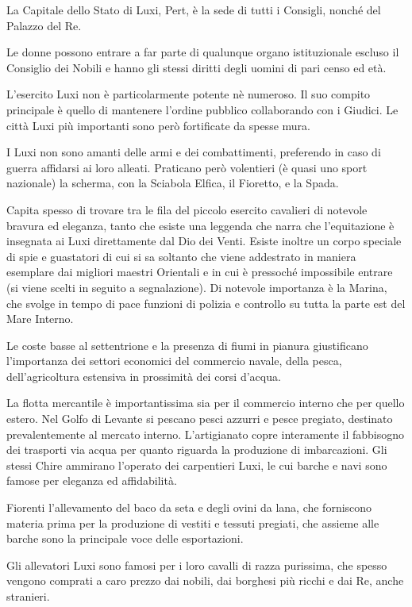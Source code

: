 La Capitale dello Stato di Luxi, Pert, \`e la sede di tutti i
Consigli, nonch\'e del Palazzo del Re.

Le donne possono entrare a far parte di qualunque organo istituzionale
escluso il Consiglio dei Nobili e hanno gli stessi diritti degli
uomini di pari censo ed et\`a.

\Esercito L'esercito Luxi non \`e
particolarmente potente n\`e numeroso. Il suo compito principale \`e
quello di mantenere l'ordine pubblico collaborando con i Giudici. Le
citt\`a Luxi pi\`u importanti sono per\`o fortificate da spesse
mura.

I Luxi non sono amanti delle armi e dei combattimenti, preferendo in
caso di guerra affidarsi ai loro alleati. Praticano per\`o
volentieri (\`e quasi uno sport nazionale) la scherma, con la
Sciabola Elfica, il Fioretto, e la Spada.

 Capita spesso di trovare tra
le fila del piccolo esercito cavalieri di notevole bravura ed
eleganza, tanto che esiste una leggenda che narra che l'equitazione
\`e insegnata ai Luxi direttamente dal Dio dei Venti.  Esiste
inoltre un corpo speciale di spie e guastatori di cui si sa soltanto
che viene addestrato in maniera esemplare dai migliori maestri
Orientali e in cui \`e pressoch\'e impossibile entrare (si viene
scelti in seguito a segnalazione).  Di notevole importanza \`e la
Marina, che svolge in tempo di pace funzioni di polizia e controllo su
tutta la parte est del Mare Interno.

\Economia Le coste basse al settentrione e la presenza di fiumi in pianura
giustificano l'importanza dei settori economici del commercio navale,
della pesca, dell'agricoltura estensiva in prossimit\`a dei corsi
d'acqua. 

La flotta mercantile \`e importantissima sia per il commercio
interno che per quello estero. Nel Golfo di Levante si pescano pesci
azzurri e pesce pregiato, destinato prevalentemente al mercato
interno. L'artigianato copre interamente il fabbisogno dei trasporti
via acqua per quanto riguarda la produzione di imbarcazioni.  Gli
stessi Chire ammirano l'operato dei carpentieri Luxi, le cui barche e
navi sono famose per eleganza ed affidabilit\`a.

Fiorenti l'allevamento del baco da seta e degli ovini da lana, che
forniscono materia prima per la produzione di vestiti e tessuti
pregiati, che assieme alle barche sono la principale voce delle
esportazioni.

Gli allevatori Luxi
sono famosi per i loro cavalli di razza purissima, che spesso vengono
comprati a caro prezzo dai nobili, dai borghesi pi\`u ricchi e dai
Re, anche stranieri.

